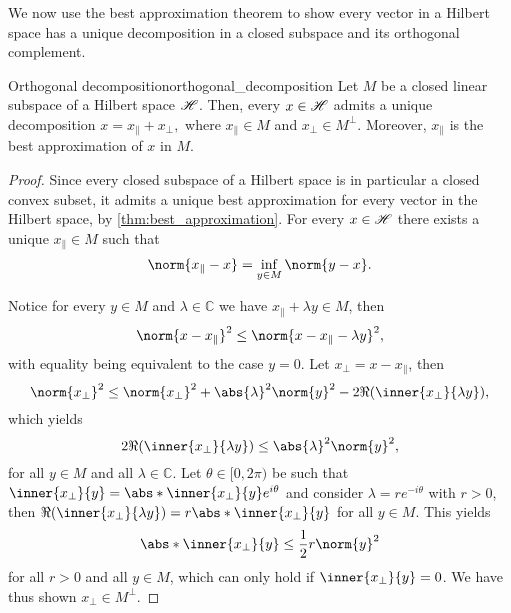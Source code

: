 We now use the best approximation theorem to show every vector in a Hilbert space has a unique decomposition in a closed subspace and its orthogonal complement.
\begin{theorem}{Orthogonal decomposition}{orthogonal_decomposition}
    Let \(M\) be a closed linear subspace of a Hilbert space \(\mathscr{H}\). Then, every \(x \in \mathscr{H}\) admits a unique decomposition \(x = x_\parallel + x_\perp,\) where \(x_\parallel \in M\) and \(x_\perp \in M^\perp\). Moreover, \(x_\parallel\) is the best approximation of \(x\) in \(M\).
\end{theorem}
\begin{proof}
    Since every closed subspace of a Hilbert space is in particular a closed convex subset, it admits a unique best approximation for every vector in the Hilbert space, by \cref{thm:best_approximation}. For every \(x \in \mathscr{H}\) there exists a unique \(x_\parallel \in M\) such that
    \begin{equation*}
        \norm{x_\parallel - x} = \inf_{y \in M}{\norm{y - x}}.
    \end{equation*}

    Notice for every \(y \in M\) and \(\lambda \in \mathbb{C}\) we have \(x_\parallel + \lambda y \in M\), then
    \begin{equation*}
        \norm{x - x_\parallel}^2 \leq \norm{x - x_\parallel - \lambda y}^2,
    \end{equation*}
    with equality being equivalent to the case \(y = 0\). Let \(x_\perp = x - x_\parallel\), then
    \begin{equation*}
        \norm{x_\perp}^2 \leq \norm{x_\perp}^2 + \abs{\lambda}^2\norm{y}^2 - 2 \Re(\inner{x_\perp}{\lambda y}),
    \end{equation*}
    which yields
    \begin{equation*}
        2 \Re(\inner{x_\perp}{\lambda y}) \leq  \abs{\lambda}^2 \norm{y}^2,
    \end{equation*}
    for all \(y \in M\) and all \(\lambda \in \mathbb{C}\). Let \(\theta \in [0, 2\pi)\) be such that \(\inner{x_\perp}{y} = \abs*{\inner{x_\perp}{y}}e^{i\theta}\) and consider \(\lambda = r e^{-i\theta}\) with \(r > 0\), then \(\Re(\inner{x_\perp}{\lambda y}) = r\abs*{\inner{x_\perp}{y}}\) for all \(y \in M\). This yields
    \begin{equation*}
        \abs*{\inner{x_\perp}{y}} \leq \frac12 r \norm{y}^2
    \end{equation*}
    for all \(r > 0\) and all \(y \in M\), which can only hold if \(\inner{x_\perp}{y} = 0\). We have thus shown \(x_\perp \in M^\perp\).


\end{proof}
